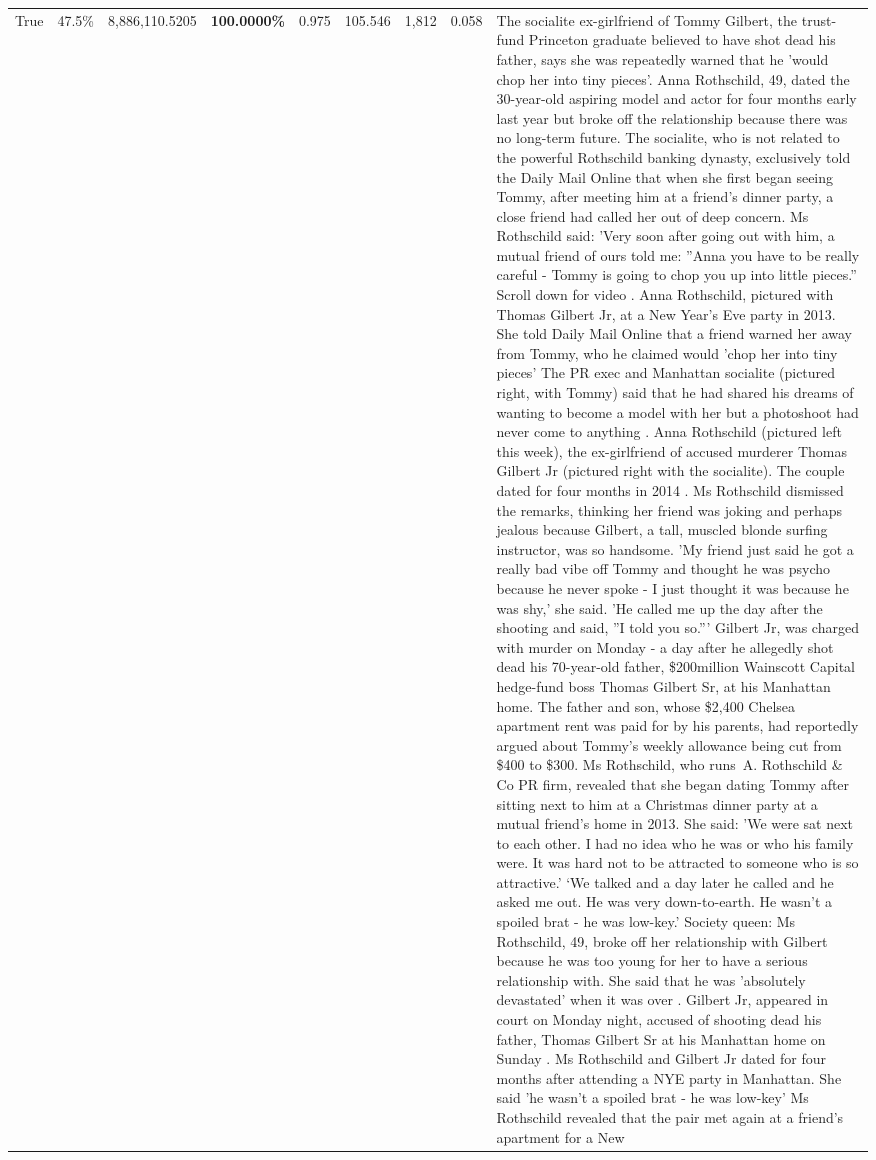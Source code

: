 \begin{table}[H]
\begin{tabular}{lllrlllll}
True & 47.5\% & 8,886,110.5205 & \bfseries \color{red} 100.0000\% & 0.975 & 105.546 & 1,812 & 0.058 & The socialite ex-girlfriend of Tommy Gilbert, the trust-fund Princeton graduate believed to have shot dead his father, says she was repeatedly warned that he 'would chop her into tiny pieces'. Anna Rothschild, 49, dated the 30-year-old aspiring model and actor for four months early last year but broke off the relationship because there was no long-term future. The socialite, who is not related to the powerful Rothschild banking dynasty, exclusively told the Daily Mail Online that when she first began seeing Tommy, after meeting him at a friend's dinner party, a close friend had called her out of deep concern. Ms Rothschild said: 'Very soon after going out with him, a mutual friend of ours told me: ''Anna you have to be really careful - Tommy is going to chop you up into little pieces.'' Scroll down for video . Anna Rothschild, pictured with Thomas Gilbert Jr, at a New Year's Eve party in 2013. She told Daily Mail Online that a friend warned her away from Tommy, who he claimed would 'chop her into tiny pieces' The PR exec and Manhattan socialite (pictured right, with Tommy) said that he had shared his dreams of wanting to become a model with her but a photoshoot had never come to anything . Anna Rothschild (pictured left this week), the ex-girlfriend of accused murderer Thomas Gilbert Jr (pictured right with the socialite). The couple dated for four months in 2014 . Ms Rothschild dismissed the remarks, thinking her friend was joking and perhaps jealous because Gilbert, a tall, muscled blonde surfing instructor, was so handsome. 'My friend just said he got a really bad vibe off Tommy and thought he was psycho because he never spoke - I just thought it was because he was shy,' she said. 'He called me up the day after the shooting and said, ''I told you so.''' Gilbert Jr, was charged with murder on Monday - a day after he allegedly shot dead his 70-year-old father, \$200million Wainscott Capital hedge-fund boss Thomas Gilbert Sr, at his Manhattan home. The father and son, whose \$2,400 Chelsea apartment rent was paid for by his parents, had reportedly argued about Tommy's weekly allowance being cut from \$400 to \$300. Ms Rothschild, who runs A. Rothschild \& Co PR firm, revealed that she began dating Tommy after sitting next to him at a Christmas dinner party at a mutual friend's home in 2013. She said: 'We were sat next to each other. I had no idea who he was or who his family were. It was hard not to be attracted to someone who is so attractive.' ‘We talked and a day later he called and he asked me out. He was very down-to-earth. He wasn’t a spoiled brat - he was low-key.’ Society queen: Ms Rothschild, 49, broke off her relationship with Gilbert because he was too young for her to have a serious relationship with. She said that he was 'absolutely devastated' when it was over . Gilbert Jr, appeared in court on Monday night, accused of shooting dead his father, Thomas Gilbert Sr at his Manhattan home on Sunday . Ms Rothschild and Gilbert Jr dated for four months after attending a NYE party in Manhattan. She said 'he wasn't a spoiled brat - he was low-key' Ms Rothschild revealed that the pair met again at a friend’s apartment for a New 
\end{tabular}
\end{table}
